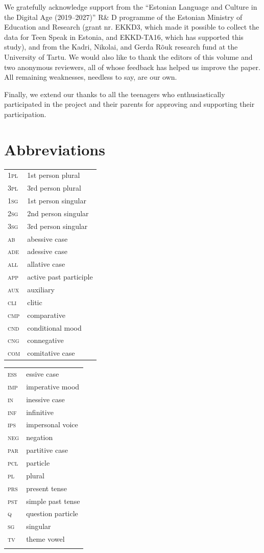 \documentclass[output=paper]{langscibook}
\begin{document}
We gratefully acknowledge support from the “Estonian Language and Culture in the Digital Age (2019–2027)” R\& D programme of the Estonian Ministry of Education and Research (grant nr. EKKD3, which made it possible to collect the data for Teen Speak in Estonia, and EKKD-TA16, which has supported this study), and from the Kadri, Nikolai, and Gerda Rõuk research fund at the University of Tartu. We would also like to thank the editors of this volume and two anonymous reviewers, all of whose feedback has helped us improve the paper. All remaining weaknesses, needless to say, are our own.

Finally, we extend our thanks to all the teenagers who enthusiastically participated in the project and their parents for approving and supporting their participation. 

\section*{Abbreviations}
\begin{tabularx}{.45\textwidth}{lQ}
1\textsc{pl} &1st person plural\\
\textsc{3pl} &3rd person plural\\
\textsc{1sg} &1st person singular\\
2\textsc{sg} &2nd person singular\\
3\textsc{sg} &3rd person singular\\
\textsc{ab} &abessive case\\
\textsc{ade} &adessive case\\
\textsc{all} &allative case\\
\textsc{app} &active past participle\\
\textsc{aux} &auxiliary\\
\textsc{cli} &clitic\\
\textsc{cmp} &comparative\\
\textsc{cnd} &conditional mood\\
\textsc{cng} &connegative\\
\textsc{com} &comitative case\\
\end{tabularx}
\begin{tabularx}{.45\textwidth}{lQ}
\textsc{ess} &essive case\\
\textsc{imp} &imperative mood\\
\textsc{in} &inessive case\\
\textsc{inf} &infinitive\\
\textsc{ips} &impersonal voice\\
\textsc{neg} &negation\\
\textsc{par} &partitive case\\
\textsc{pcl} &particle\\
\textsc{pl} &plural\\
\textsc{prs} &present tense\\
\textsc{pst} &simple past tense\\
\textsc{q} &question particle\\
\textsc{sg} &singular\\
\textsc{tv} &theme vowel\\
\\
\end{tabularx}
\end{document}
